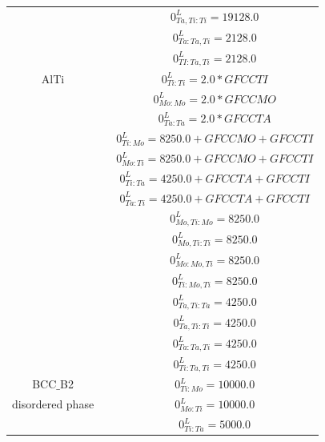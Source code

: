 \begin{longtable}[H]{ c c c }
                              & \cite{Ansara1998} & $0^\textit{L}_{Ta,Ti:Ti} = 19128.0$\\
                              & \cite{Ansara1998} & $0^\textit{L}_{Ta:Ta,Ti} = 2128.0$\\
                              & \cite{Ansara1998} & $0^\textit{L}_{TI:Ta,Ti} = 2128.0$\\
                       AlTi & \cite{Ansara1998} & $0^\textit{L}_{Ti:Ti} = 2.0*GFCCTI$\\
                              & \cite{Ansara1998} & $0^\textit{L}_{Mo:Mo} = 2.0*GFCCMO$\\
                              & \cite{Ansara1998} & $0^\textit{L}_{Ta:Ta} = 2.0*GFCCTA$\\
                              & \cite{Ansara1998} & $0^\textit{L}_{Ti:Mo} = 8250.0+GFCCMO+GFCCTI$\\
                              & \cite{Ansara1998} & $0^\textit{L}_{Mo:Ti} = 8250.0+GFCCMO+GFCCTI$\\
                              & \cite{Ansara1998} & $0^\textit{L}_{Ti:Ta} = 4250.0+GFCCTA+GFCCTI$\\
                              & \cite{Ansara1998} & $0^\textit{L}_{Ta:Ti} = 4250.0+GFCCTA+GFCCTI$\\
                              & \cite{Ansara1998} & $0^\textit{L}_{Mo,Ti:Mo} = 8250.0$\\
                              & \cite{Ansara1998} & $0^\textit{L}_{Mo,Ti:Ti} = 8250.0$\\
                        & \cite{Ansara1998} & $0^\textit{L}_{Mo:Mo,Ti} = 8250.0$\\
                        & \cite{Ansara1998} & $0^\textit{L}_{Ti:Mo,Ti} = 8250.0$\\
                        & \cite{Ansara1998} & $0^\textit{L}_{Ta,Ti:Ta} = 4250.0$\\
                        & \cite{Ansara1998} & $0^\textit{L}_{Ta,Ti:Ti} = 4250.0$\\
                        & \cite{Ansara1998} & $0^\textit{L}_{Ta:Ta,Ti} = 4250.0$\\
                        & \cite{Ansara1998} & $0^\textit{L}_{Ti:Ta,Ti} = 4250.0$\\
      BCC$\_$B2 & \cite{Ansara1998} & $0^\textit{L}_{Ti:Mo} = 10000.0$\\
  disordered phase & \cite{Ansara1998} & $0^\textit{L}_{Mo:Ti} = 10000.0$\\
                              & \cite{Ansara1998} & $0^\textit{L}_{Ti:Ta} = 5000.0$\\

\end{longtable}
